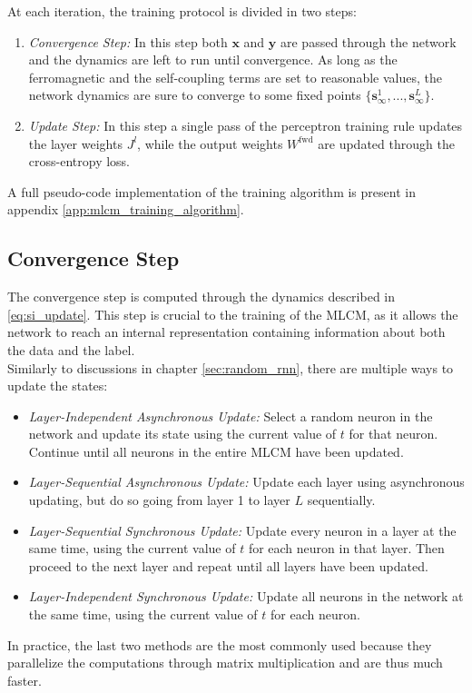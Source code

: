 \documentclass[a4paper,12pt]{report}
\begin{document}
At each iteration, the training protocol is divided in two steps: 
\begin{enumerate}
    \itemsep-5pt
    \vspace*{-5pt}
    \item \emph{Convergence Step:} In this step both $\mathbf{x}$ and $\mathbf{y}$ are
    passed through the network and the dynamics are left to run until convergence. As 
    long as the ferromagnetic and the self-coupling terms are set to reasonable values,
    the network dynamics are sure to converge to some fixed points 
    $\{\mathbf{s}^{1}_{\infty}, ..., \mathbf{s}^{L}_{\infty}\}$.
    
    \item \emph{Update Step:} In this step a single pass of the perceptron training
    rule updates the layer weights $J^l$, while the output weights $W^{\mathrm{fwd}}$
    are updated through the cross-entropy loss. 
\end{enumerate}

A full pseudo-code implementation of the training algorithm is present in appendix
\ref{app:mlcm_training_algorithm}.
%
\subsection{Convergence Step}
The convergence step is computed through the dynamics described in \ref{eq:si_update}. 
This step is crucial to the training of the MLCM, as it allows the network to reach an 
internal representation containing information about both the data and the label. \\
Similarly to discussions in chapter \ref{sec:random_rnn}, there are multiple ways to
update the states:
\begin{itemize}
    \itemsep-5pt
    \vspace*{-5pt}
    \item \emph{Layer-Independent Asynchronous Update:} Select a random neuron in 
    the network and update its state using the current value of $t$ for that neuron.
    Continue until all neurons in the entire MLCM have been updated. 
    \item \emph{Layer-Sequential Asynchronous Update:} Update each layer using 
    asynchronous updating, but do so going from layer 1 to layer $L$ sequentially.
    \item \emph{Layer-Sequential Synchronous Update:} Update every neuron in a layer
    at the same time, using the current value of $t$ for each neuron in that layer.
    Then proceed to the next layer and repeat until all layers have been updated.
    \item \emph{Layer-Independent Synchronous Update:} Update all neurons in the
    network at the same time, using the current value of $t$ for each neuron.
\end{itemize}
In practice, the last two methods are the most commonly used because they parallelize 
the computations through matrix multiplication and are thus much faster.
\end{document}
